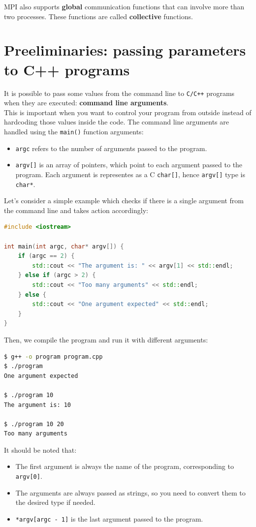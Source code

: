 MPI also supports \textbf{global} communication functions that can involve more than two 
processes. These functions are called \textbf{collective} functions.

\section{Preeliminaries: passing parameters to C++ programs}

It is possible to pass some values from the command line to \texttt{C/C++} programs when
they are executed: \textbf{command line arguments}.\\

This is important when you want to control your program from outside instead of
hardcoding those values inside the code. The command line arguments are handled using
the \texttt{main()} function arguments:
\begin{itemize}
    \item \texttt{argc} refers to the number of arguments passed to the program.
    \item \texttt{argv[]} is an array of pointers, which point to each argument passed
    to the program. Each argument is representes as a C \texttt{char[]}, hence 
    \texttt{argv[]} type is \texttt{char*}.
\end{itemize}

Let's consider a simple example which checks if there is a single argument from the command
line and takes action accordingly:

\begin{lstlisting}[language=C++]
#include <iostream>

int main(int argc, char* argv[]) {
    if (argc == 2) {
        std::cout << "The argument is: " << argv[1] << std::endl;
    } else if (argc > 2) {
        std::cout << "Too many arguments" << std::endl;
    } else {
        std::cout << "One argument expected" << std::endl;
    }
}
\end{lstlisting}

Then, we compile the program and run it with different arguments:
\begin{lstlisting}[language=bash]
$ g++ -o program program.cpp
$ ./program
One argument expected

$ ./program 10
The argument is: 10

$ ./program 10 20
Too many arguments
\end{lstlisting}

It should be noted that:
\begin{itemize}
    \item The first argument is always the name of the program, corresponding to
    \texttt{argv[0]}.
    \item The arguments are always passed as strings, so you need to convert them
    to the desired type if needed.
    \item \texttt{*argv[argc - 1]} is the last argument passed to the program.
\end{itemize}

